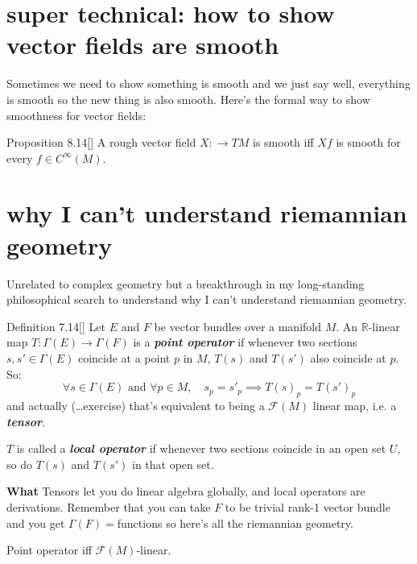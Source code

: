 \section{super technical: how to show vector fields are smooth}

Sometimes we need to show something is smooth and we just say well, everything is smooth so the new thing is also smooth. Here's the formal way to show smoothness for vector fields:

\begin{thing7}{Proposition 8.14}[\cite{les}]\leavevmode
A rough vector field \(X : \to TM\) is smooth iff \(Xf\) is smooth for every \(f\in C^\infty(M)\).
\end{thing7}

\section{why I can't understand riemannian geometry}

Unrelated to complex geometry but a breakthrough in my long-standing philosophical search to understand why I can't understand riemannian geometry.

\begin{thing4}{Definition 7.14}[\cite{tud}]\label{def:7.14}\leavevmode
Let \(E\) and \(F\) be vector bundles over a manifold \(M\). An \(\mathbb{R}\)-linear map \(T:\Gamma(E)\longrightarrow \Gamma(F)\) is a \textit{\textbf{point operator}} if whenever two sections \(s,s' \in \Gamma(E)\) coincide at a point \(p\) in \(M\), \(T(s)\) and \(T(s')\) also coincide at \(p\). So:
\[\forall s \in \Gamma(E)\text{ and } \forall  p \in M, \quad s_p=s'_p \implies T(s)_p=T(s')_p\]
and actually (…exercise) that's equivalent to being a \(\mathcal{F}(M)\) linear map, i.e. a \textit{\textbf{tensor}}.

\(T\) is called a \textit{\textbf{local operator}} if whenever two sections coincide in an open set \(U\), so do \(T(s)\) and  \(T(s')\) in that open set.

{\color{2}\bfseries What}\hspace{.5em} Tensors let you do linear algebra globally, and local operators are derivations. Remember that you can take \(F\) to be trivial rank-1 vector bundle and you get \(\Gamma(F)=\)functions so here's all the riemannian geometry.
\end{thing4}

\begin{exercise}\leavevmode
Point operator iff \(\mathcal{F}(M)\)-linear.
\end{exercise}

